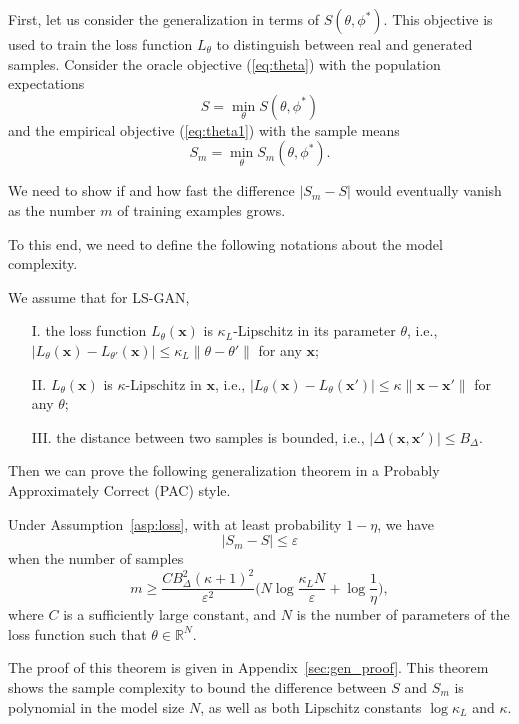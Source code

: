 First, let us consider the generalization in terms of $S(\theta,\phi^*)$.
This objective is used to train the loss function $L_\theta$ to distinguish between real and generated samples.
Consider the oracle objective  (\ref{eq:theta}) with the population expectations
$$
S=\min_\theta S(\theta,\phi^*)
$$
and the empirical objective (\ref{eq:theta1}) with the sample means
$$
S_m=\min_\theta S_m(\theta,\phi^*).
$$

We need to show if and how fast the difference $|S_m-S|$ would eventually vanish as the number $m$ of training examples grows.

To this end, we need to define the following notations about the model complexity.
\begin{assumption}\label{asp:loss}
We assume that for LS-GAN,
\begin{itemize}
\item[I.] the loss function $L_\theta(\mathbf x)$ is $\kappa_L$-Lipschitz in its parameter $\theta$, i.e., $|L_\theta(\mathbf x)-L_{\theta'}(\mathbf x)|\leq \kappa_L\|\theta-\theta'\|$ for any $\mathbf x$;
\item[II.] $L_\theta(\mathbf x)$ is $\kappa$-Lipschitz in $\mathbf x$, i.e., $|L_\theta(\mathbf x)-L_\theta(\mathbf x')|\leq\kappa\|\mathbf x-\mathbf x'\|$ for any $\theta$;
\item[III.] the distance between two samples is bounded, i.e., $|\Delta(\mathbf x, \mathbf x')|\leq B_\Delta$.
\end{itemize}
\end{assumption}

Then we can prove the following generalization theorem in a Probably Approximately Correct (PAC) style.
\begin{theorem}\label{thm:generalization}
Under Assumption~\ref{asp:loss}, with at least probability $1-\eta$, we have
$$
|S_m - S|\leq \varepsilon
$$
when the number of samples
$$
m\geq\dfrac{C B_\Delta^2(\kappa+1)^2}{\varepsilon^2} \big(N \log\dfrac{\kappa_L N}{\varepsilon}+\log\dfrac{1}{\eta}\big),$$
where $C$ is a sufficiently large constant, and $N$ is the number of parameters of the loss function such that $\theta\in\mathbb R^N$.
\end{theorem}
The proof of this theorem is given in Appendix~\ref{sec:gen_proof}. This theorem shows the sample complexity to bound the difference between $S$ and $S_m$ is polynomial in the model size $N$, as well as both Lipschitz constants $\log\kappa_L$ and $\kappa$.


